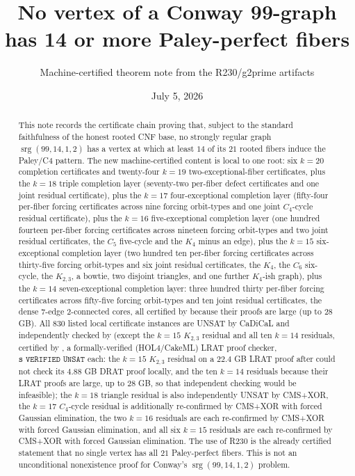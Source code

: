 \documentclass[11pt]{article}
\title{No vertex of a Conway 99-graph has 14 or more Paley-perfect fibers}
\author{Machine-certified theorem note from the R230/g2prime artifacts}
\date{July 5, 2026}
\newcommand{\srg}{\operatorname{srg}}
\newcommand{\codepath}[1]{\texttt{\detokenize{#1}}}
\begin{document}
\maketitle

\begin{abstract}
This note records the certificate chain proving that, subject to the standard
faithfulness of the honest rooted CNF base, no strongly regular graph
\(\srg(99,14,1,2)\) has a vertex at which at least \(14\) of its \(21\)
rooted fibers induce the Paley/C4 pattern.  The new machine-certified content
is local to one root: six \(k=20\) completion certificates and twenty-four
\(k=19\) two-exceptional-fiber certificates, plus the \(k=18\) triple
completion layer (seventy-two per-fiber defect certificates and one joint
residual certificate), plus the \(k=17\) four-exceptional completion layer
(fifty-four per-fiber forcing certificates across nine forcing orbit-types and
one joint \(C_4\)-cycle residual certificate), plus the \(k=16\)
five-exceptional completion layer (one hundred fourteen per-fiber forcing
certificates across nineteen forcing orbit-types and two joint residual
certificates, the \(C_5\) five-cycle and the \(K_4\) minus an edge), plus the
\(k=15\) six-exceptional completion layer (two hundred ten per-fiber forcing
certificates across thirty-five forcing orbit-types and six joint residual
certificates, the \(K_4\), the \(C_6\) six-cycle, the \(K_{2,3}\), a bowtie,
two disjoint triangles, and one further \(K_4\)-ish graph), plus the \(k=14\)
seven-exceptional completion layer: three hundred thirty per-fiber forcing
certificates across fifty-five forcing orbit-types and ten joint residual
certificates, the dense \(7\)-edge \(2\)-connected cores, all certified by
\codepath{cake_lpr} because their proofs are large (up to \(28\) GB).  All
\(830\) listed local certificate instances are UNSAT by CaDiCaL and
independently checked by \codepath{drat-trim} (except the \(k=15\) \(K_{2,3}\)
residual and all ten \(k=14\) residuals, certified by
\codepath{cake_lpr}, a formally-verified (HOL4/CakeML) LRAT proof checker,
\(\texttt{s VERIFIED UNSAT}\) each: the \(k=15\) \(K_{2,3}\) residual on a
\(22.4\) GB LRAT proof after \codepath{drat-trim} could not check its
\(4.88\) GB DRAT proof locally, and the ten \(k=14\) residuals because their
LRAT proofs are large, up to \(28\) GB, so that independent \codepath{drat-trim}
checking would be infeasible); the \(k=18\) triangle
residual is also independently UNSAT by CMS+XOR, the \(k=17\) \(C_4\)-cycle
residual is additionally re-confirmed by CMS+XOR
with forced Gaussian elimination, the two \(k=16\) residuals are each
re-confirmed by CMS+XOR with forced Gaussian elimination, and all six \(k=15\)
residuals are each re-confirmed by CMS+XOR with forced Gaussian elimination.
The use of R230 is the already certified statement that no single vertex has
all \(21\) Paley-perfect fibers.  This is not an unconditional nonexistence
proof for Conway's \(\srg(99,14,1,2)\) problem.
\end{abstract}
\end{document}
